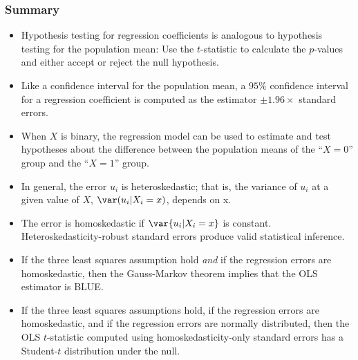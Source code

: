 

\begin{frame}
\frametitle{Summary}
\begin{itemize}
\item Hypothesis testing for regression coefficients is analogous to hypothesis testing for the population mean: Use the $t$-statistic to calculate the $p$-values and either accept or reject the null hypothesis. 
\item Like a confidence interval for the population mean, a $95\%$ confidence interval for a regression coefficient is computed as the estimator $\pm 1.96 \times$ standard errors.
\item When $X$ is binary, the regression model can be used to estimate and test hypotheses about the difference between the population means of the ``$X=0$'' group and the ``$X=1$'' group.
\item In general, the error $u_i$ is heteroskedastic; that is, the variance of $u_i$ at a given value of $X$, $\var(u_i|X_i=x)$, depends on x. 
\item The error is homoskedastic if $\var{u_i|X_i=x}$ is constant. Heteroskedasticity-robust standard errors produce valid statistical inference.
\item If the three least squares assumption hold \textit{and} if the regression errors are homoskedastic, then the Gauss-Markov theorem implies that the OLS estimator is BLUE.
\item If the three least squares assumptions hold, if the regression errors are homoskedastic, and if the regression errors are normally distributed, then the OLS $t$-statistic computed using homoskedasticity-only standard errors has a Student-$t$ distribution under the null. 
\end{itemize}
\end{frame}


